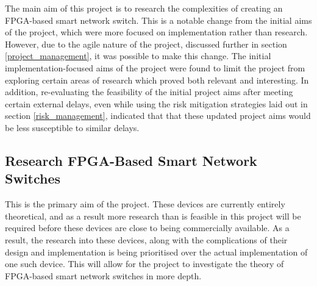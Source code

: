 











The main aim of this project is to research the complexities of creating an FPGA-based smart network switch. This is a notable change from the initial aims of the project, which were more focused on implementation rather than research. However, due to the agile nature of the project, discussed further in section \ref{project_management}, it was possible to make this change.
The initial implementation-focused aims of the project were found to limit the project from exploring certain areas of research which proved both relevant and interesting. In addition, re-evaluating the feasibility of the initial project aims after meeting certain external delays, even while using the risk mitigation strategies laid out in section \ref{risk_management}, indicated that that these updated project aims would be less susceptible to similar delays.

\subsection{Research FPGA-Based Smart Network Switches}
This is the primary aim of the project. These devices are currently entirely theoretical, and as a result more research than is feasible in this project will be required before these devices are close to being commercially available. As a result, the research into these devices, along with the complications of their design and implementation is being prioritised over the actual implementation of one such device. This will allow for the project to investigate the theory of FPGA-based smart network switches in more depth.

